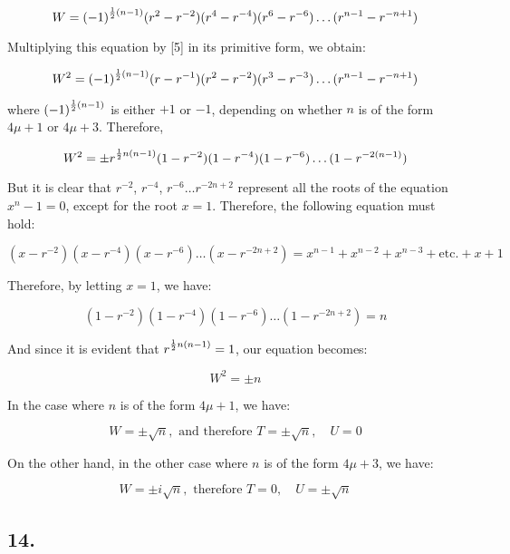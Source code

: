\documentclass[twoside,12pt, showframe]{memoir}
\let\oldfrac\frac
\def\frac#1#2{\mathchoice{\tfrac{#1}{#2}}{\oldfrac{#1}{#2}}{\genfrac{}{}{}{2}{#1}{#2\mathstrut}}{\genfrac{}{}{}{3}{#1}{#2\mathstrut}}}
\begin{document}
\[W=(-1)^{\frac{1}{2}(n-1)}(r^{2}-r^{-2})(r^{4}-r^{-4})(r^{6}-r^{-6}) \ldots (r^{n-1}-r^{-n+1})\]

Multiplying this equation by [5] in its primitive form, we obtain:

\[W^{2}=(-1)^{\frac{1}{2}(n-1)}(r-r^{-1})(r^{2}-r^{-2})(r^{3}-r^{-3}) \ldots (r^{n-1}-r^{-n+1})\]

where \((-1)^{\frac{1}{2}(n-1)}\) is either \(+1\) or \(-1\), depending on whether \(n\) is of the form \(4 \mu+1\) or \(4 \mu+3\). Therefore,

\[W^{2}= \pm r^{\frac{1}{2} n(n-1)}(1-r^{-2})(1-r^{-4})(1-r^{-6}) \ldots(1-r^{-2(n-1)})\]

But it is clear that \(r^{-2}\), \(r^{-4}\), \(r^{-6} \ldots r^{-2 n+2}\) represent all the roots of the equation \(x^{n}-1=0\), except for the root \(x=1\). Therefore, the following equation must hold:

\[(x-r^{-2})(x-r^{-4})(x-r^{-6}) \ldots(x-r^{-2 n+2})=x^{n-1}+x^{n-2}+x^{n-3}+\text{etc.}+x+1\]

Therefore, by letting \(x=1\), we have:

\[(1-r^{-2})(1-r^{-4})(1-r^{-6}) \ldots(1-r^{-2 n+2})=n\]

And since it is evident that \(r^{\frac{1}{2} n(n-1)}=1\), our equation becomes:

\[W^{2}= \pm n \tag{6}\]

In the case where \(n\) is of the form \(4 \mu+1\), we have:

\[W= \pm \sqrt{n}, \text{ and therefore } T= \pm \sqrt{n}, \quad U=0\]

On the other hand, in the other case where \(n\) is of the form \(4 \mu+3\), we have:

\[W= \pm i \sqrt{n}, \text{ therefore } T=0, \quad U= \pm \sqrt{n}\]
%

\subsection*{14.}
\end{document}
